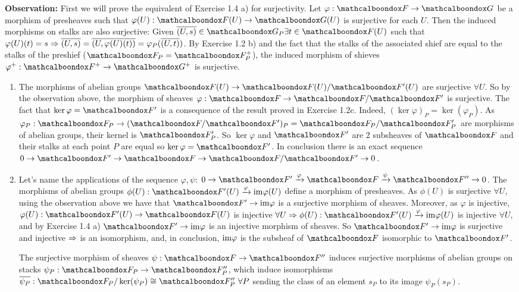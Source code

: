 \begin{sol}
	\textbf{Observation:} First we will prove the equivalent of Exercise 1.4 a) for surjectivity. Let $\varphi: \sF \to \sG$ be a morphism of presheaves such that $\varphi(U): \sF(U) \to \sG(U)$ is surjective for each $U$. Then the induced morphisms on stalks are also surjective: Given $\overline{(U,s)} \in \sG_P \exists t \in \sF(U)$ such that $\varphi(U)(t) = s \Rightarrow \overline{(U,s)} = \overline{(U, \varphi(U)(t))} = \varphi_P(\overline{(U,t)})$. By Exercise 1.2 b) and the fact that the stalks of the associated shief are equal to the stalks of the preshief ($\sF_P = \sF^{+}_P$), the induced morphism of shieves $\varphi^{+}: \sF^{+} \to \sG^{+}$ is surjective.
	\begin{enumerate}[label=\alph*)]
		\item The morphisms of abelian groups $\sF(U) \to \sF(U)/\sF'(U)$ are surjective $\forall U$. So by the observation above, the morphism of sheaves $\varphi: \sF \to \sF/\sF'$ is surjective. The fact that $\ker \varphi = \sF'$ is a consequence of the result proved in Exercise 1.2c. Indeed, $(\ker \varphi)_P = \ker (\varphi_P)$. As $\varphi_P: \sF_P \to (\sF/\sF')_P = \sF_P/\sF'_P$ are morphisms of abelian groups, their kernel is $\sF'_P$. So $\ker \varphi$ and $\sF'$ are 2 subsheaves of $\sF$ and their stalks at each point $P$ are equal so $\ker \varphi = \sF'$. In conclusion there is an exact sequence $0 \to \sF' \to \sF \to \sF / \sF' \to 0$.

		\item Let's name the applications of the sequence $\varphi, \psi$: $0 \xrightarrow[]{} \sF' \xrightarrow[]{\varphi} \sF \xrightarrow[]{\psi} \sF'' \xrightarrow[]{} 0$. The morphisms of abelian groups $\phi(U): \sF'(U) \xrightarrow[]{\varphi} \ima\varphi(U)$ define a morphism of presheaves. As $\phi(U)$ is surjective $\forall U$, using the observation above we have that $\sF' \to \ima \varphi$ is a surjective morphism of sheaves. Moreover, as $\varphi$ is injective, $\varphi(U): \sF'(U) \to \sF(U)$ is injective $\forall U \imp \phi(U): \sF'(U) \xrightarrow[]{\varphi} \ima \varphi(U)$ is injective $\forall U$, and by Exercise 1.4 a) $\sF' \to \ima \varphi$ is an injective morphism of sheaves. So $\sF' \to \ima \varphi$ is surjective and injective $\Rightarrow$ is an isomorphism, and, in conclusion, $\mathrm{im} \varphi$ is the subsheaf of $\sF$ isomorphic to $\sF'$.

		The surjective morphism of sheaves $\psi: \sF \to \sF''$ induces surjective morphisms of abelian groups on stacks $\psi_P: \sF_P \to \sF''_P$, which induce isomorphisms $\overline{\psi_P}: \sF_P/\ker(\psi_P) \cong \sF''_P \, \, \forall P$ sending the class of an element $s_P$ to its image $\psi_P(s_P)$. 


\end{enumerate}
\end{sol}
